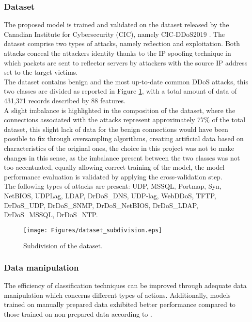 \documentclass[runningheads]{llncs}
\begin{document}
\subsubsection{Dataset}
The proposed model is trained and validated on the dataset released by the Canadian Institute for Cybersecurity (CIC), namely
CIC-DDoS2019 \cite{dataset}. The dataset comprise two types of attacks, namely reflection and exploitation.
Both attacks conceal the attacker\textquotesingle s identity thanks to the IP spoofing technique \cite{ref_paper4} 
in which packets are sent to reflector servers by attackers with the source IP address set to the target victim\textquotesingle s.\\
The dataset contains benign and the most up-to-date common DDoS attacks, this two classes are divided as reported in
Figure \ref{fig2}, with a total amount of data of 431,371 records described by 88 features.\\
A slight imbalance is highlighted in the composition of the dataset, where the connections associated with the attacks represent approximately 77\% of the total dataset, this slight lack of data for the benign connections would have been possible to fix through oversampling algorithms, creating artificial data based on characteristics of the original ones, the choice in this project was not to make changes in this sense, as the imbalance present between the two classes was not too accentuated, equally allowing correct training of the model, the model performance evaluation is validated by applying the cross-validation step.\\
The following types of attacks are present: UDP, MSSQL, Portmap, Syn, NetBIOS, UDPLag, LDAP,
 DrDoS\_DNS, UDP-lag, WebDDoS, TFTP, DrDoS\_UDP, DrDoS\_SNMP,
 DrDoS\_NetBIOS, DrDoS\_LDAP, DrDoS\_MSSQL, DrDoS\_NTP.

\begin{figure}[h]
    \centering
    \texttt{[image: Figures/dataset\_subdivision.eps]}
    \caption{Subdivision of the dataset.}
    \label{fig2}
\end{figure}

\subsubsection{Data manipulation}
The efficiency of classification techniques can be improved through adequate data manipulation which concerns different types of actions. Additionally, models trained on manually
prepared data exhibited better performance compared to those trained on non-prepared data according to \cite{ref_paper5}.
\end{document}
